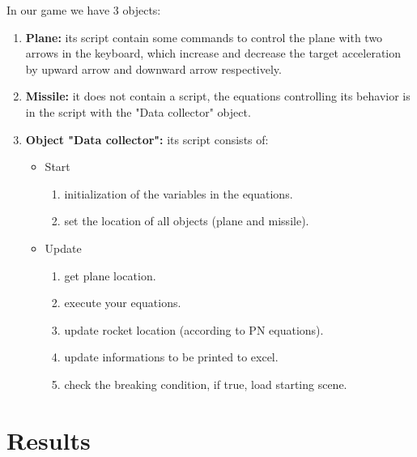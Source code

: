 In our game we have 3 objects:
\begin{enumerate}
	\item \textbf{Plane:} its script contain some commands to control the plane with two arrows in the keyboard, which increase and decrease the target acceleration by upward arrow and downward arrow respectively. 
	\item \textbf{Missile:} it does not contain a script, the equations controlling its behavior is in the script with the "Data collector" object.
	\item \textbf{Object "Data collector":} its script consists of:
	
	\begin{itemize}
		\item Start
		\begin{enumerate}
			\item initialization of the variables in the equations.
			\item set the location of all objects (plane and missile).
		\end{enumerate}
		\item Update 
		\begin{enumerate}
			\item get plane location.
			\item execute your equations.
			\item update rocket location (according to PN equations).
			\item update informations to be printed to excel.
			\item check the breaking condition, if true, load starting scene.
		\end{enumerate}
	\end{itemize}


\end{enumerate} 




 
\section{Results}

